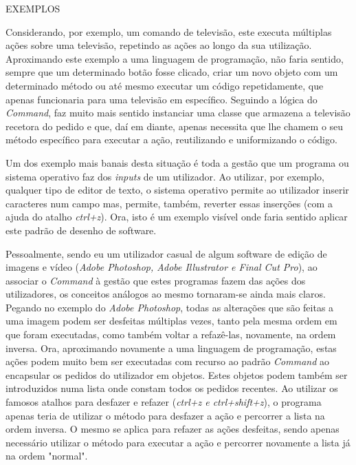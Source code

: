 \documentclass[10pt,portuguese]{article}
\begin{document}
\par EXEMPLOS

\par

Considerando, por exemplo, um comando de televisão, este executa múltiplas ações sobre uma televisão, repetindo as ações ao longo da sua utilização. Aproximando este exemplo a uma linguagem de programação, não faria sentido, sempre que um determinado botão fosse clicado, criar um novo objeto com um determinado método ou até mesmo executar um código repetidamente, que apenas funcionaria para uma televisão em específico. 
Seguindo a lógica do \textit{Command}, faz muito mais sentido instanciar uma classe que armazena a televisão recetora do pedido e que, daí em diante, apenas necessita que lhe chamem o seu método específico para executar a ação, reutilizando e uniformizando o código. 

 Um dos exemplo mais banais desta situação é toda a gestão que um programa ou sistema operativo faz dos \textit{inputs} de um utilizador. 
Ao utilizar, por exemplo, qualquer tipo de editor de texto, o sistema operativo permite ao utilizador inserir caracteres num campo mas, permite, também, reverter essas inserções (com a ajuda do atalho \textit{ctrl+z}). Ora, isto é um exemplo visível onde faria sentido aplicar este padrão de desenho de software.

\par Pessoalmente, sendo eu um utilizador casual de algum software de edição de imagens e vídeo (\textit{Adobe Photoshop, Adobe Illustrator e Final Cut Pro}), ao associar o \textit{Command} à gestão que estes programas fazem das ações dos utilizadores, os conceitos análogos ao mesmo tornaram-se ainda mais claros. Pegando no exemplo do \textit{Adobe Photoshop}, todas as alterações que são feitas a uma imagem podem ser desfeitas múltiplas vezes, tanto pela mesma ordem em que foram executadas, como também voltar a refazê-las, novamente, na ordem inversa. 
Ora, aproximando novamente a uma linguagem de programação, estas ações podem muito bem ser executadas com recurso ao padrão \textit{Command} ao encapsular os pedidos do utilizador em objetos. Estes objetos podem também ser introduzidos numa lista onde constam todos os pedidos recentes. 
Ao utilizar os famosos atalhos para desfazer e refazer (\textit{ctrl+z e ctrl+shift+z}), o programa apenas teria de utilizar o método para desfazer a ação e percorrer a lista na ordem inversa. O mesmo se aplica para refazer as ações desfeitas, sendo apenas necessário utilizar o método para executar a ação e percorrer novamente a lista já na ordem "normal".
\end{document}
